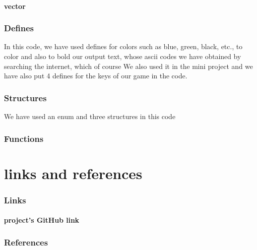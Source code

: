 \documentclass[12pt,a4paper]{article}
\begin{document}
	\subsection{vector}
	
	\section{Defines}\label{description.defines}
	In this code, we have used defines for colors such as blue, green, black, etc., to color and also to bold our output text, whose ascii codes we have obtained by searching the internet, which of course We also used it in the mini project and we have also put 4 defines for the keys of our game in the code.
	\section{Structures}\label{description.structs}
	We have used an enum and three structures in this code
	\section{Functions}\label{description.func}
	
	\newpage
	\setcounter{section}{0}
	\part{links and references}\label{linkAndRef}
	
	\section{Links}\label{linkAndRef.links}
	\subsection*{project's GitHub link}
	\href{https://github.com/Matin0789/FinalFight.git}{\color{blue}{https://github.com/Matin0789/FinalFight.git}}
	
	
	\section{References}\label{linkAndRef.ref}
	
\end{document}
